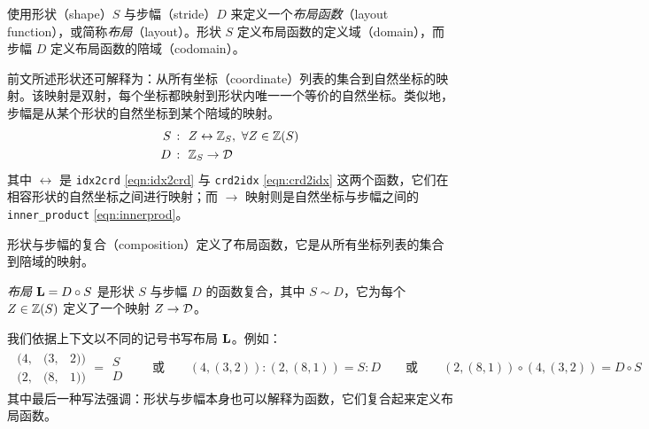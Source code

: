 
\label{sec:layout}

\CuTe 使用形状（shape）$S$ 与步幅（stride）$D$ 来定义一个\emph{布局函数}（layout function），或简称\emph{布局}（layout）。形状 $S$ 定义布局函数的定义域（domain），而步幅 $D$ 定义布局函数的陪域（codomain）。

前文所述形状还可解释为：从所有坐标（coordinate）列表的集合到自然坐标的映射。该映射是双射，每个坐标都映射到形状内唯一一个等价的自然坐标。类似地，步幅是从某个形状的自然坐标到某个陪域的映射。
\begin{align*}
S \ &\colon \ Z \leftrightarrow \mathbb{Z}_S, \ \forall Z \in \mathbb{Z}(S) \\
D \ &\colon \ \mathbb{Z}_S \to \mathcal{D}
\end{align*}
其中 $\leftrightarrow$ 是 {\tt idx2crd} \eqref{eqn:idx2crd} 与 {\tt crd2idx} \eqref{eqn:crd2idx} 这两个函数，它们在相容形状的自然坐标之间进行映射；而 $\to$ 映射则是自然坐标与步幅之间的 \texttt{inner\_product} \eqref{eqn:innerprod}。

形状与步幅的复合（composition）定义了布局函数，它是从所有坐标列表的集合到陪域的映射。

\begin{definition}
\emph{布局} $\mathbf{L} = D \circ S$ 是形状 $S$ 与步幅 $D$ 的函数复合，其中 $S \sim D$，它为每个 $Z \in \mathbb{Z}(S)$ 定义了一个映射 $Z \to \mathcal{D}$。
\end{definition}


我们依据上下文以不同的记号书写布局 $\mathbf{L}$。例如：
\begin{align*}
\begin{array}{ccc} (4, & (3, & 2)) \\ (2, & (8, & 1)) \end{array} = \begin{array}{c} S \\ D \end{array} \quad\quad \text{或} \quad\quad (4, (3, 2)) : (2, (8, 1)) = S : D  \quad\quad \text{或} \quad\quad (2, (8, 1)) \circ (4, (3, 2)) = D \circ S
\end{align*}
其中最后一种写法强调：形状与步幅本身也可以解释为函数，它们复合起来定义布局函数。

